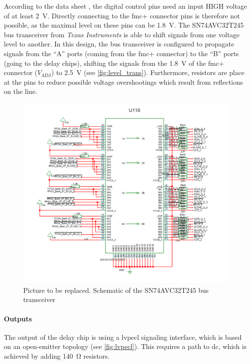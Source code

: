 According to the data sheet \cite{NB6L295}, the digital control pins need an input HIGH voltage of at least \SI{2}{\volt}.
Directly connecting to the \gls{fmc}+ connector pins is therefore not possible, as the maximal level on these pins can be \SI{1.8}{\volt}.
The SN74AVC32T245 bus transceiver from \textit{Texas Instruments} is able to shift signals from one voltage level to another.
In this design, the bus transceiver is configured to propagate signals from the ``A'' ports (coming from the \gls{fmc}+ connector) to the ``B'' ports (going to the delay chips), shifting the signals from the \SI{1.8}{\volt} of the \gls{fmc}+ connector ($V_\text{ADJ}$) to \SI{2.5}{\volt} (see \autoref{fig:level_trans}).
Furthermore, resistors are place at the pins to reduce possible voltage overshootings which result from reflections on the line. 

\begin{figure}[tbh]
	\centering
	\includegraphics[width = \textwidth]{chap/04-work/img/level_trans}
	\caption[SN74AVC32T245 bus transceiver]{Picture to be replaced. Schematic of the SN74AVC32T245 bus transceiver}
	\label{fig:level_trans}
\end{figure}

\paragraph{Outputs}
The output of the delay chip is using a \gls{lvpecl} signaling interface, which is based on an open-emitter topology (see \autoref{fig:lvpecl}).
This requires a path to \gls{dc}, which is achieved by adding \SI{140}{\ohm} resistors.

